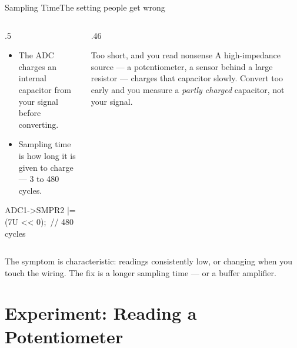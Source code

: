 \documentclass[9pt,aspectratio=169,xcolor=table]{beamer}
\begin{document}
\begin{frame}{Sampling Time}{The setting people get wrong}
    \begin{columns}[T]
    \begin{column}{.5\textwidth}
        \begin{itemize}
            \item The ADC charges an internal capacitor from your signal
                  \alert{before} converting.
            \item \alert{Sampling time} is how long it is given to charge ---
                  3 to 480 cycles.
        \end{itemize}

        \vspace{2mm}
        {\ttfamily\scriptsize ADC1->SMPR2 |= (7U <{}< 0);~// 480 cycles}
    \end{column}
    \begin{column}{.46\textwidth}
        \begin{block}{Too short, and you read nonsense}
            A \alert{high-impedance} source --- a potentiometer, a sensor behind a
            large resistor --- charges that capacitor slowly. Convert too early and
            you measure a \emph{partly charged} capacitor, not your signal.
        \end{block}
    \end{column}
    \end{columns}

    \vspace{3mm}
    {\small The symptom is characteristic: readings \alert{consistently low}, or
    changing when you touch the wiring. The fix is a longer sampling time --- or a
    buffer amplifier.}
\end{frame}


\section{Experiment: Reading a Potentiometer}
\end{document}
